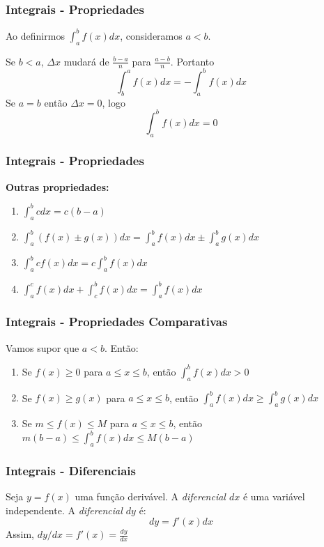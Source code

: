 \documentclass[hyperref={pdfpagelabels=false}]{beamer}
\begin{document}
\begin{frame}
\frametitle{Integrais - Propriedades}

Ao definirmos $\int_{a}^{b}f(x)dx$, consideramos $a<b$.

Se $b<a$, $\Delta x$ mudará de $\displaystyle \frac{b-a}{n}$ para $\displaystyle \frac{a - b}{n}$. Portanto
$$\int_{b}^{a}f(x)dx = - \int_{a}^{b}f(x)dx$$
Se $a=b$ então $\Delta x = 0$, logo  
$$\int_{a}^{b}f(x)dx = 0$$

\end{frame}

\begin{frame}
\frametitle{Integrais - Propriedades}
{\bf Outras propriedades:}
\begin{enumerate}
	\item $\displaystyle \int_{a}^{b}cdx = c(b-a)$
	\item $\displaystyle \int_{a}^{b}(f(x) \pm g(x))dx = \displaystyle \int_{a}^{b}f(x)dx \pm \displaystyle \int_{a}^{b}g(x)dx$
	\item $\displaystyle \int_{a}^{b}cf(x)dx = c\displaystyle \int_{a}^{b}f(x)dx$
	\item $\displaystyle \int_{a}^{c}f(x)dx + \displaystyle \int_{c}^{b}f(x)dx = \displaystyle \int_{a}^{b}f(x)dx$
\end{enumerate}

\end{frame}

\begin{frame}
\frametitle{Integrais - Propriedades Comparativas}
Vamos supor que $a<b$. Então:
\begin{enumerate}
	\item Se $f(x) \geq 0$ para $a \leq x \leq b$, então $\displaystyle \int_{a}^{b}f(x)dx > 0$
	\item Se $f(x) \geq g(x)$ para $a \leq x \leq b$, então $\displaystyle \int_{a}^{b}f(x)dx \geq \displaystyle \int_{a}^{b}g(x)dx$
	\item Se $m \leq f(x) \leq M$ para $a \leq x \leq b$, então
	$m(b-a) \leq \displaystyle \int_{a}^{b}f(x)dx \leq M(b-a)$
\end{enumerate}

\end{frame}

\begin{frame}
\frametitle{Integrais - Diferenciais}

Seja $y = f(x)$ uma função derivável. A \emph{diferencial $dx$} é uma variável independente. A \emph{diferencial $dy$} é:
$$dy = f'(x)dx$$
Assim, $dy / dx = f'(x) = \displaystyle \frac{dy}{dx}$

\end{frame}
\end{document}
